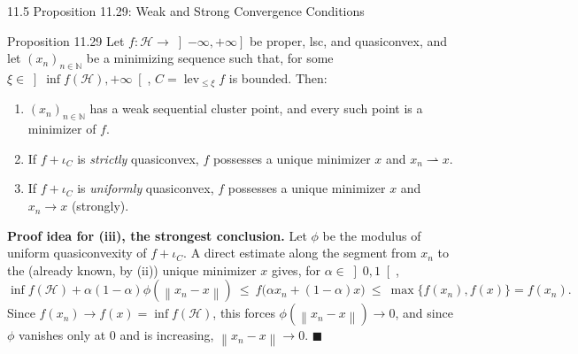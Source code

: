 \documentclass[aspectratio=169,10pt]{beamer}
\newcommand{\mHH}{\mathcal H}
\newcommand{\norm}[1]{\left\|#1\right\|}
\newcommand{\lev}{\operatorname{lev}}
\newcommand{\iC}{\iota_C}
\begin{document}
\begin{frame}{11.5 Proposition 11.29: Weak and Strong Convergence Conditions}

  \begin{alertblock}{Proposition 11.29}
    Let $f:\mHH\to\left]-\infty,+\infty\right]$ be proper, lsc, and
    quasiconvex, and let $(x_n)_{n\in\mathbb N}$ be a minimizing
    sequence such that, for some $\xi\in\left]\inf f(\mHH),+\infty\right[$,
    $C=\lev_{\le\xi}f$ is bounded. Then:
    \begin{enumerate}
      \item[(i)] $(x_n)_{n\in\mathbb N}$ has a weak sequential cluster
            point, and every such point is a minimizer of $f$.
      \item[(ii)] If $f+\iC$ is \emph{strictly} quasiconvex, $f$
            possesses a unique minimizer $x$ and $x_n\rightharpoonup x$.
      \item[(iii)] If $f+\iC$ is \emph{uniformly} quasiconvex, $f$
            possesses a unique minimizer $x$ and $x_n\to x$
            (strongly).
    \end{enumerate}
  \end{alertblock}

  \textbf{Proof idea for (iii), the strongest conclusion.} Let $\phi$
  be the modulus of uniform quasiconvexity of $f+\iC$. A direct
  estimate along the segment from $x_n$ to the (already known, by
  (ii)) unique minimizer $x$ gives, for $\alpha\in\left]0,1\right[$,
  \[
    \inf f(\mHH)+\alpha(1-\alpha)\phi(\norm{x_n-x})\ \le\ f\bigl(\alpha x_n+(1-\alpha)x\bigr)\ \le\ \max\{f(x_n),f(x)\}=f(x_n).
  \]
  Since $f(x_n)\to f(x)=\inf f(\mHH)$, this forces
  $\phi(\norm{x_n-x})\to0$, and since $\phi$ vanishes only at $0$ and
  is increasing, $\norm{x_n-x}\to0$. \hfill$\blacksquare$

\end{frame}
\end{document}
